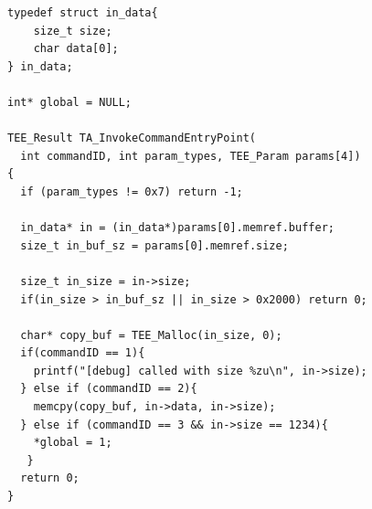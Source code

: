 \begin{lstlisting}[columns=fullflexible]
typedef struct in_data{
    size_t size;
    char data[0];
} in_data;

int* global = NULL;

TEE_Result TA_InvokeCommandEntryPoint(
  int commandID, int param_types, TEE_Param params[4])
{
  if (param_types != 0x7) return -1;

  in_data* in = (in_data*)params[0].memref.buffer;
  size_t in_buf_sz = params[0].memref.size;
 
  size_t in_size = in->size; 
  if(in_size > in_buf_sz || in_size > 0x2000) return 0;

  char* copy_buf = TEE_Malloc(in_size, 0);
  if(commandID == 1){
    printf("[debug] called with size %zu\n", in->size);
  } else if (commandID == 2){
    memcpy(copy_buf, in->data, in->size);
  } else if (commandID == 3 && in->size == 1234){
    *global = 1;
   }
  return 0;
}
\end{lstlisting}
